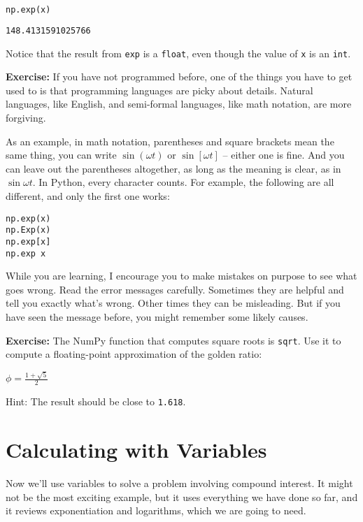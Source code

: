 \begin{lstlisting}[language=Python,style=source]
np.exp(x)
\end{lstlisting}

\begin{lstlisting}[style=output]
148.4131591025766
\end{lstlisting}

Notice that the result from \passthrough{\lstinline!exp!} is a
\passthrough{\lstinline!float!}, even though the value of
\passthrough{\lstinline!x!} is an \passthrough{\lstinline!int!}.

\textbf{Exercise:} If you have not programmed before, one of the things
you have to get used to is that programming languages are picky about
details. Natural languages, like English, and semi-formal languages,
like math notation, are more forgiving.

As an example, in math notation, parentheses and square brackets mean
the same thing, you can write \(\sin (\omega t)\) or \(\sin [\omega t]\)
-- either one is fine. And you can leave out the parentheses altogether,
as long as the meaning is clear, as in \(\sin \omega t\). In Python,
every character counts. For example, the following are all different,
and only the first one works:

\begin{lstlisting}[style=output]
np.exp(x)
np.Exp(x)
np.exp[x]
np.exp x
\end{lstlisting}

While you are learning, I encourage you to make mistakes on purpose to
see what goes wrong. Read the error messages carefully. Sometimes they
are helpful and tell you exactly what's wrong. Other times they can be
misleading. But if you have seen the message before, you might remember
some likely causes.

\textbf{Exercise:} The NumPy function that computes square roots is
\passthrough{\lstinline!sqrt!}. Use it to compute a floating-point
approximation of the golden ratio:

\(\phi = \frac{1 + \sqrt{5}}{2}\)

Hint: The result should be close to \passthrough{\lstinline!1.618!}.

\hypertarget{calculating-with-variables}{%
\section{Calculating with Variables}\label{calculating-with-variables}}

Now we'll use variables to solve a problem involving compound interest.
It might not be the most exciting example, but it uses everything we
have done so far, and it reviews exponentiation and logarithms, which we
are going to need.

